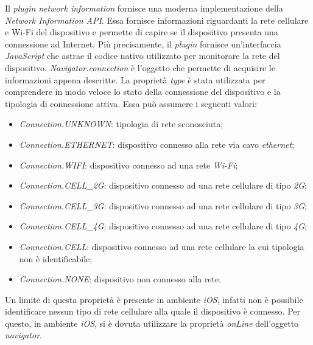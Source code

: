 Il \textit{plugin} \textit{network information} fornisce una moderna implementazione della \textit{Network Information API}. Essa fornisce informazioni riguardanti la rete cellulare e Wi-Fi del dispositivo e permette di capire se il dispositivo presenta una connessione ad Internet. Più precisamente, il \textit{plugin} fornisce un'interfaccia \textit{JavaScript} che astrae il codice nativo utilizzato per monitorare la rete del dispositivo. \textit{Navigator.connection} è l'oggetto che permette di acquisire le informazioni appena descritte. La proprietà \textit{type} è stata utilizzata per comprendere in modo veloce lo stato della connessione del dispositivo e la tipologia di connessione attiva. Essa può assumere i seguenti valori:
\begin{itemize}
	\item \textit{Connection.UNKNOWN}: tipologia di rete sconosciuta;
	\item \textit{Connection.ETHERNET}: dispositivo connesso alla rete via cavo \textit{ethernet};
	\item \textit{Connection.WIFI}: dispositivo connesso ad una rete \textit{Wi-Fi};
	\item \textit{Connection.CELL\_2G}: dispositivo connesso ad una rete cellulare di tipo \textit{2G};
	\item \textit{Connection.CELL\_3G}: dispositivo connesso ad una rete cellulare di tipo \textit{3G};
	\item \textit{Connection.CELL\_4G}: dispositivo connesso ad una rete cellulare di tipo \textit{4G};
	\item \textit{Connection.CELL}: dispositivo connesso ad una rete cellulare la cui tipologia non è identificabile;
	\item \textit{Connection.NONE}: dispositivo non connesso alla rete.
\end{itemize}
Un limite di questa proprietà è presente in ambiente \textit{iOS}, infatti non è possibile identificare nessun tipo di rete cellulare alla quale il dispositivo è connesso. Per questo, in ambiente \textit{iOS}, si è dovuta utilizzare la proprietà \textit{onLine} dell'oggetto \textit{navigator}.

